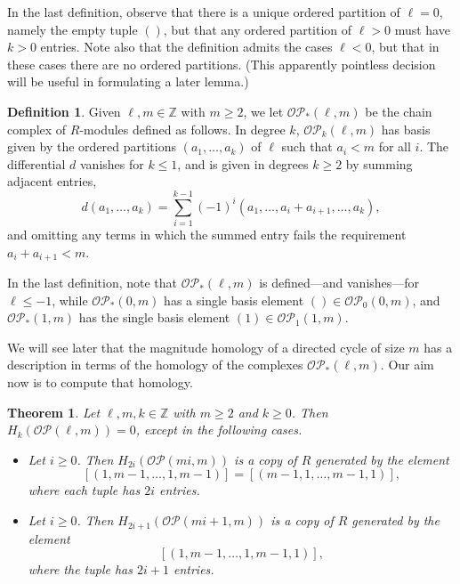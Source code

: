 \documentclass[a4paper, 11 pt, oneside, reqno]{amsart}
\numberwithin{lemma}{section}
\newtheorem{theorem}[lemma]{Theorem}
\theoremstyle{definition}
\newtheorem{definition}[lemma]{Definition}
\newcommand{\OP}{\mathcal{OP}}
\newcommand{\mathbbZ}{\mathbb{Z}}
\begin{document}
In the last definition, 
observe that there is a unique ordered partition of $\ell=0$,
namely the empty tuple $()$, but that any ordered partition of 
$\ell>0$ must have $k>0$ entries.
Note also that the definition admits the cases $\ell<0$,
but that in these cases there are no ordered partitions.
(This apparently pointless decision will be useful 
in formulating a later lemma.)

\begin{definition}
    Given $\ell,m\in\mathbbZ$ with $m\geq 2$,  
    we let $\OP_\ast(\ell,m)$ be the chain complex 
    of $R$-modules defined as follows.
    In degree $k$,
    $\OP_k(\ell,m)$ has basis given by the ordered 
    partitions $(a_1,\ldots,a_k)$ of $\ell$
    such that $a_i<m$ for all $i$.
    The differential $d$ vanishes for $k\leq 1$,
    and is given in degrees $k\geq 2$ 
    by summing  adjacent entries,
    \[
        d(a_1,\ldots,a_k)
        =
        \sum_{i=1}^{k-1} (-1)^i
        (a_1,\ldots,a_i+a_{i+1},\ldots,a_k),
    \]
    and omitting any terms in which the summed entry
    fails the requirement $a_i+a_{i+1}<m$.
\end{definition}

In the last definition, note that
$\OP_\ast(\ell,m)$ is defined---and vanishes---for $\ell\leq -1$,
while $\OP_\ast(0,m)$ has a single basis element
$()\in\OP_0(0,m)$, 
and $\OP_\ast(1,m)$ has the single basis element
$(1)\in\OP_1(1,m)$.

We will see later that the magnitude homology of a directed cycle
of size $m$ has a description in terms of 
the homology of the complexes $\OP_\ast(\ell,m)$.
Our aim now is to compute that homology.

\begin{theorem}\label{OP-homology}
    Let $\ell,m,k\in\mathbbZ$ with $m\geq 2$ and $k\geq 0$.
    Then $H_k(\OP(\ell,m))=0$, except in the following cases.
    \begin{itemize}
        \item
        Let $i\geq 0$.
        Then $H_{2i}(\OP(mi,m))$ is a copy of $R$ generated by
        the element 
        \[
            [
                {(1,m-1,\ldots,1,m-1)}
            ]
            =
            [
                {(m-1,1,\ldots,m-1,1)}
            ],
        \]
        where each tuple has $2i$ entries.
        \item
        Let $i\geq 0$.
        Then $H_{2i+1}(\OP(mi+1,m))$ 
        is a copy of $R$ generated by the element 
        \[
            [
                {(1,m-1,\ldots,1,m-1,1)}
            ],
        \]
        where the tuple has $2i+1$ entries.
    \end{itemize}
\end{theorem}
\end{document}
